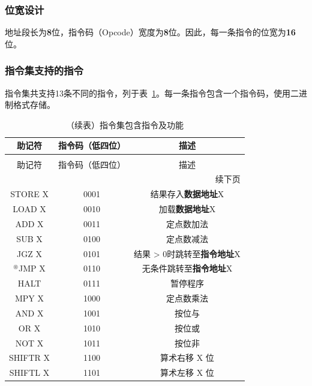 \documentclass[lang=cn,a4paper,newtx]{elegantpaper}
\begin{document}
\subsubsection{位宽设计}
地址段长为\textbf{8}位，指令码（Opcode）宽度为\textbf{8}位。因此，每一条指令的位宽为\textbf{16}位。


\subsubsection{指令集支持的指令}
指令集共支持13条不同的指令，列于表~\ref{tab:ISA:instructions}。每一条指令包含一个指令码，使用二进制格式存储。
  


\begin{longtable}{c c c}
  \caption{指令集包含指令及功能} \label{tab:ISA:instructions} \\
  \toprule
  助记符  & 指令码（低四位） & 描述 \\
  \midrule
  \endfirsthead
  
  \caption[]{（续表）指令集包含指令及功能} \\
  \toprule
  助记符  & 指令码（低四位） & 描述 \\
  \midrule
  \endhead
  
  \midrule
  \multicolumn{3}{r}{续下页} \\
  \midrule
  \endfoot
  
  \bottomrule
  \endlastfoot
  
  STORE X &  0001   & 结果存入\textbf{数据地址}X \\
  LOAD X  & 0010    & 加载\textbf{数据地址}X \\
  ADD X   & 0011    & 定点数加法\\
  SUB X   & 0100  & 定点数减法\\
  JGZ X   & 0101    & 结果 > 0时跳转至\textbf{指令地址}X\\
  $^\circledast$JMP X   & 0110    & 无条件跳转至\textbf{指令地址}X\\
  HALT    & 0111    & 暂停程序\\
  MPY X   & 1000    & 定点数乘法 \\
  AND X   & 1001    & 按位与\\
  OR X    & 1010    & 按位或\\
  NOT X   & 1011    & 按位非 \\
  SHIFTR X & 1100    & 算术右移 X 位\\
  SHIFTL X & 1101    & 算术左移 X 位\\
\end{longtable}
\end{document}
